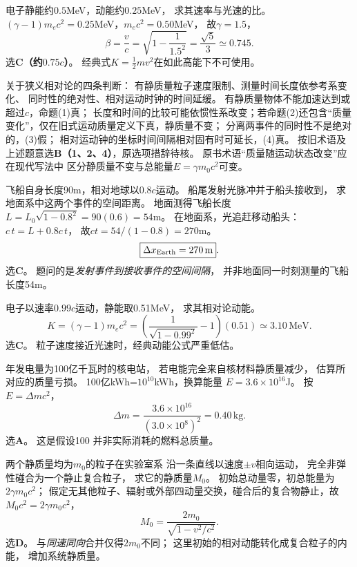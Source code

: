 \problemtext 电子静能约$0.5$MeV，动能约$0.25$MeV，
求其速率与光速的比。
\workings
$(\gamma-1)m_ec^2=0.25$MeV，$m_ec^2=0.50$MeV，
故$\gamma=1.5$，
\[
\boxed{\beta=\frac vc=\sqrt{1-\frac1{1.5^2}}
=\frac{\sqrt5}{3}\simeq0.745}.
\]
选\textbf{C（约$0.75c$）}。
\crosscheck 经典式$K=\tfrac12mv^2$在如此高能下不可使用。

\problemtext 关于狭义相对论的四条判断：
有静质量粒子速度限制、测量时间长度依参考系变化、
同时性的绝对性、相对运动时钟的时间延缓。
\workings
有静质量物体不能加速达到或超过$c$，命题(1)真；
长度和时间的比较可能依惯性系改变；若命题(2)还包含“质量变化”，仅在旧式运动质量定义下真，静质量不变；
分离两事件的同时性不是绝对的，(3)假；
相对运动钟的坐标时间间隔相对固有时可延长，(4)真。
按旧术语及上述题意选\textbf{B（1、2、4）}，原选项措辞待核。
\crosscheck 原书术语“质量随运动状态改变”应在现代写法中
区分静质量不变与总能量$E=\gamma m_0c^2$可变。

\problemtext 飞船自身长度90m，相对地球以$0.8c$运动。
船尾发射光脉冲并于船头接收到，
求地面系中这两个事件的空间距离。
\workings
地面测得飞船长度
$L=L_0\sqrt{1-0.8^2}=90(0.6)=54$m。
在地面系，光追赶移动船头：
$c\,t=L+0.8c\,t$，
故$ct=54/(1-0.8)=270$m。
\[
\boxed{\Delta x_{\rm Earth}=270\,\mathrm m}.
\]
选\textbf{C}。
\crosscheck 题问的是\emph{发射事件到接收事件的空间间隔}，
并非地面同一时刻测量的飞船长度54m。

\problemtext 电子以速率$0.99c$运动，静能取0.51MeV，
求其相对论动能。
\workings
\[
\boxed{K=(\gamma-1)m_ec^2
=\left(\frac1{\sqrt{1-0.99^2}}-1\right)(0.51)
\simeq3.10\,\mathrm{MeV}}.
\]
选\textbf{C}。
\crosscheck 粒子速度接近光速时，经典动能公式严重低估。

\problemtext 年发电量为100亿千瓦时的核电站，
若电能完全来自核材料静质量减少，
估算所对应的质量亏损。
\workings
100亿kWh=$10^{10}$kWh，换算能量
$E=3.6\times10^{16}$J。
按$E=\Delta mc^2$，
\[
\boxed{\Delta m=\frac{3.6\times10^{16}}
{(3.0\times10^8)^2}=0.40\,\mathrm{kg}}.
\]
选\textbf{A}。
\crosscheck 这是假设100%
并非实际消耗的燃料总质量。

\problemtext 两个静质量均为$m_0$的粒子在实验室系
沿一条直线以速度$\pm v$相向运动，
完全非弹性碰合为一个静止复合粒子，
求它的静质量$M_0$。
\workings
初始总动量零，初总能量为$2\gamma m_0c^2$；
假定无其他粒子、辐射或外部四动量交换，碰合后的复合物静止，故
$M_0c^2=2\gamma m_0c^2$，
\[
\boxed{M_0=\frac{2m_0}{\sqrt{1-v^2/c^2}}}.
\]
选\textbf{D}。
\crosscheck 与\emph{同速同向}合并仅得$2m_0$不同；
这里初始的相对动能转化成复合粒子的内能，
增加系统静质量。

